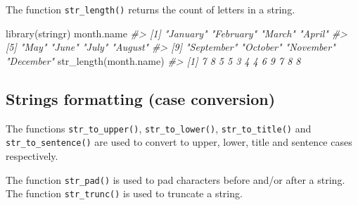 \documentclass[
]{book}
\newenvironment{Shaded}{\begin{snugshade}}{\end{snugshade}}
\newcommand{\CommentTok}[1]{\textcolor[rgb]{0.56,0.35,0.01}{\textit{#1}}}
\newcommand{\FunctionTok}[1]{\textcolor[rgb]{0.00,0.00,0.00}{#1}}
\newcommand{\NormalTok}[1]{#1}
\begin{document}
The function \texttt{str\_length()} returns the count of letters in a string.

\begin{Shaded}
\begin{Highlighting}[]
\FunctionTok{library}\NormalTok{(stringr)}
\NormalTok{month.name}
\CommentTok{\#\textgreater{}  [1] "January"   "February"  "March"     "April"    }
\CommentTok{\#\textgreater{}  [5] "May"       "June"      "July"      "August"   }
\CommentTok{\#\textgreater{}  [9] "September" "October"   "November"  "December"}
\FunctionTok{str\_length}\NormalTok{(month.name)}
\CommentTok{\#\textgreater{}  [1] 7 8 5 5 3 4 4 6 9 7 8 8}
\end{Highlighting}
\end{Shaded}

\hypertarget{strings-formatting-case-conversion}{%
\subsection{Strings formatting (case conversion)}\label{strings-formatting-case-conversion}}

The functions \texttt{str\_to\_upper()}, \texttt{str\_to\_lower()}, \texttt{str\_to\_title()} and \texttt{str\_to\_sentence()} are used to convert to upper, lower, title and sentence cases respectively.

The function \texttt{str\_pad()} is used to pad characters before and/or after a string.
The function \texttt{str\_trunc()} is used to truncate a string.
\end{document}
